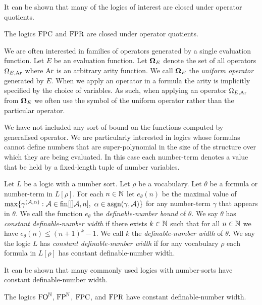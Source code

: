 \documentclass[../main/thesis.tex]{subfiles}
\begin{document}
It can be shown that many of the logics of interest are closed under operator
quotients.

\begin{lem}
  The logics $\text{\upshape FPC}$ and $\text{\upshape FPR}$ are closed under operator quotients.
  \label{lem:logics-operator-quotients}
\end{lem}

We are often interested in families of operators generated by a single
evaluation function. Let $E$ be an evaluation function. Let $\mathbf{\mathbf{\Omega}}_E$ denote
the set of all operators $\Omega_{E, \text{\upshape Ar}}$ where $\text{\upshape Ar}$ is an arbitrary arity
function. We call $\mathbf{\mathbf{\Omega}}_E$ the \emph{uniform operator} generated by $E$. When
we apply an operator in a formula the arity is implicitly specified by the
choice of variables. As such, when applying an operator $\Omega_{E, \text{\upshape Ar}}$ from
$\mathbf{\mathbf{\Omega}}_E$ we often use the symbol of the uniform operator rather than the
particular operator.

We have not included any sort of bound on the functions computed by generalised
operator. We are particularly interested in logics whose formulas cannot define
numbers that are super-polynomial in the size of the structure over which they
are being evaluated. In this case each number-term denotes a value that be held
by a fixed-length tuple of number variables.

\begin{definition}
  Let $L$ be a logic with a number sort. Let $\rho$ be a vocabulary. Let
  $\theta$ be a formula or number-term in $L[\rho]$. For each $n \in \mathbb{N}$ let
  $e_{\theta}(n) $ be the maximal value of $\max\{\gamma^{(\mathcal{A}, \alpha)}
  : \mathcal{A} \in \text{\upshape fin}{[[]}\mathcal{A}, n] , \,\, \alpha \in
  \text{\upshape asgn}(\gamma, \mathcal{A})\}$ for any number-term $\gamma$ that appears in
  $\theta$. We call the function $e_{\theta}$ the \emph{definable-number bound}
  of $\theta$. We say $\theta$ has \emph{constant definable-number width} if
  there exists $k \in \mathbb{N}$ such that for all $n \in \mathbb{N}$ we have
  $e_{\theta}(n) \leq (n+1)^k - 1$. We call $k$ the \emph{definable-number
    width} of $\theta$. We say the logic $L$ has \emph{constant definable-number
    width} if for any vocabulary $\rho$ each formula in $L[\rho]$ has constant
  definable-number width.
\end{definition}

It can be shown that many commonly used logics with number-sorts have constant
definable-number width.

\begin{lem}
  The logics $\text{\upshape FO}^{\mathbb{N}}$, $\text{\upshape FP}^{\mathbb{N}}$, $\text{\upshape FPC}$, and $\text{\upshape FPR}$ have constant
  definable-number width.
  \label{lem:logics-constant-number-width}
\end{lem}
\end{document}

